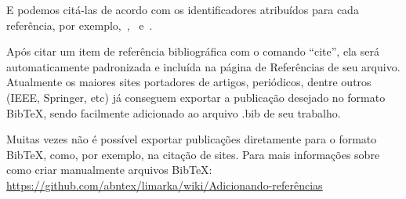 E podemos citá-las de acordo com os identificadores atribuídos para cada referência, por exemplo,~\cite{stonebraker93},~\cite{rocha09} e~\cite{keras}.

Após citar um item de referência bibliográfica com o comando ``cite'', ela será automaticamente padronizada e incluída na página de Referências de seu arquivo. Atualmente os maiores sites portadores de artigos, periódicos, dentre outros (IEEE, Springer, etc) já conseguem exportar a publicação desejado no formato BibTeX, sendo facilmente adicionado ao arquivo .bib de seu trabalho.

Muitas vezes não é possível exportar publicações diretamente para o formato BibTeX, como, por exemplo, na citação de sites. Para mais informações sobre como criar manualmente arquivos BibTeX: \url{https://github.com/abntex/limarka/wiki/Adicionando-referências}